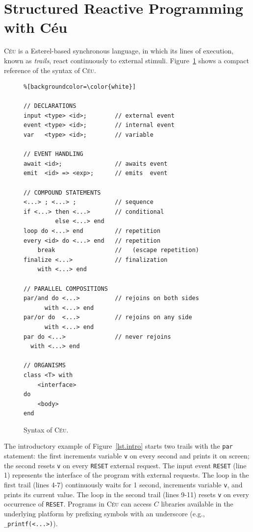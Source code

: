 \documentclass{acm_proc_article-sp}
\newcommand{\CEU}{\textsc{C\'{e}u}\xspace}
\newcommand{\code}[1] {{\small{\texttt{#1}}}}
\newcommand{\1}{\;}
\newcommand{\2}{\;\;}
\newcommand{\3}{\;\;\;}
\newcommand{\5}{\;\;\;\;\;}
\begin{document}
\section{Structured Reactive Programming with C\'eu}
\label{sec.ceu}

\CEU is a Esterel-based synchronous language, in which its lines of execution, 
known as \emph{trails}, react continuously to external stimuli.
%
Figure~\ref{lst.syntax} shows a compact reference of the syntax of \CEU.

\begin{figure}[t]
\begin{lstlisting}%[backgroundcolor=\color{white}]

// DECLARATIONS
input <type> <id>;        // external event
event <type> <id>;        // internal event
var   <type> <id>;        // variable

// EVENT HANDLING
await <id>;               // awaits event
emit  <id> => <exp>;      // emits  event

// COMPOUND STATEMENTS
<...> ; <...> ;           // sequence
if <...> then <...>       // conditional
         else <...> end
loop do <...> end         // repetition
every <id> do <...> end   // repetition
    break                 //   (escape repetition)
finalize <...>            // finalization
    with <...> end

// PARALLEL COMPOSITIONS
par/and do <...>          // rejoins on both sides
      with <...> end
par/or do  <...>          // rejoins on any side
      with <...> end
par do <...>              // never rejoins
  with <...> end

// ORGANISMS
class <T> with
    <interface>
do
    <body>
end
\end{lstlisting}
\caption{ Syntax of \CEU.
\label{lst.syntax}
}
\end{figure}

The introductory example of Figure~\ref{lst.intro} starts two trails with the 
\code{par} statement: the first increments variable \code{v} on every second 
and prints it on screen; the second resets \code{v} on every \code{RESET} 
external request.
%
The input event \code{RESET} (line 1) represents the interface of the program 
with external requests.
The loop in the first trail (lines 4-7) continuously waits for 1 second, 
increments variable \code{v}, and prints its current value.
The loop in the second trail (lines 9-11) resets \code{v} on every occurrence 
of \code{RESET}.
%
Programs in \CEU can access $C$ libraries available in the underlying platform 
by prefixing symbols with an underscore (e.g., \code{\_printf(<...>)}).
\end{document}
